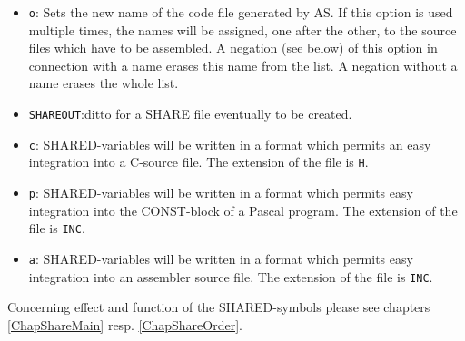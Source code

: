 \documentclass[12pt,twoside]{report}
\newcommand{\tty}[1]{{\tt #1}}
\newcommand{\asname}{{AS}}
\begin{document}
\begin{itemize}
{      separated by the given character.  A period is used as separator if
      no explicit character is given.  This option is usually used in conjunction
      with the \tty{LISTRADIX} option.  For instance, list radix 8 with a
      period as character results in the so-called 'split octal' notation.}
\item{\tty{o}: Sets the new name of the code file generated by \asname{}.  If this
      option is used multiple times, the names will be assigned, one
      after the other, to the source files which have to be
      assembled.  A negation (see below) of this option in
      connection with a name erases this name from the list.  A
      negation without a name erases the whole list.}
\item{\tty{SHAREOUT}:ditto for a SHARE file eventually to be created.}
\item{\tty{c}: SHARED-variables will be written in a format which permits
      an easy integration into a C-source file.  The extension of
      the file is \tty{H}.}
\item{\tty{p}: SHARED-variables will be written in a format which permits
      easy integration into the CONST-block of a Pascal program.
      The extension of the file is \tty{INC}.}
\item{\tty{a}: SHARED-variables will be written in a format which permits
      easy integration into an assembler source file. The
      extension of the file is \tty{INC}.}
\end{itemize}
Concerning effect and function of the SHARED-symbols please see
chapters \ref{ChapShareMain} resp. \ref{ChapShareOrder}.
\end{document}
